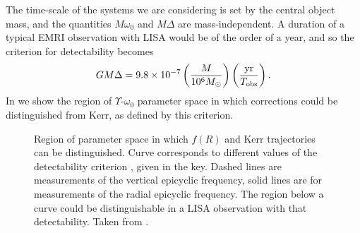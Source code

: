 The time-scale of the systems we are considering is set by the central object mass, and the quantities $M\omega_0$ and $M\Delta$ are mass-independent. A duration of a typical EMRI observation with LISA would be of the order of a year, and so the criterion for detectability becomes \citep{Berry2011}
\begin{equation}
GM\Delta = 9.8\times10^{-7} \left(\frac{M}{10^6 M_{\odot}}\right) \left(\frac{\mathrm{yr}}{T_\mathrm{obs}}\right). \label{eq:detcrit}
\end{equation}
In  we show the region of $\Upsilon$-$\omega_0$ parameter space in which corrections could be distinguished from Kerr, as defined by this criterion.
\begin{figure}%
\centering
{}
\quad{}
\caption{\label{fig:epifig}Region of parameter space in which $f(R)$ and Kerr trajectories can be distinguished. Curve corresponds to different values of the detectability criterion , given in the key. Dashed lines are measurements of the vertical epicyclic frequency, solid lines are for measurements of the radial epicyclic frequency. The region below a curve could be distinguishable in a LISA observation with that detectability. Taken from \citet{Berry2011}.}
\end{figure}
